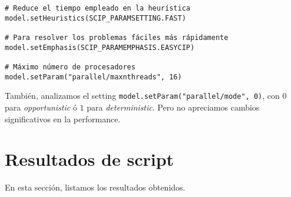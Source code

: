 \documentclass[11pt, a4paper, pdftex]{article}
\begin{document}
\begin{verbatim}
# Reduce el tiempo empleado en la heurística
model.setHeuristics(SCIP_PARAMSETTING.FAST)

# Para resolver los problemas fáciles más rápidamente
model.setEmphasis(SCIP_PARAMEMPHASIS.EASYCIP)

# Máximo número de procesadores
model.setParam("parallel/maxnthreads", 16)
\end{verbatim}

También, analizamos el setting \verb|model.setParam("parallel/mode", 0)|,
con $0$ para \emph{opportunistic} ó $1$ para \emph{deterministic}.
Pero no apreciamos cambios significativos en la performance.

\newpage

\section{Resultados de script}

En esta sección, listamos los resultados obtenidos.

\newpage
\begin{landscape}
\begin{table}[ht]
\centering
{}
\caption{Resultados del Script}
\end{table}
\end{landscape}

\newpage
\end{document}
